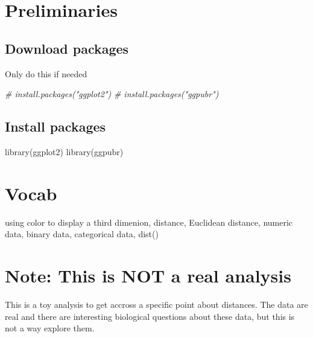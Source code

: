 \documentclass[
]{book}
\newenvironment{Shaded}{\begin{snugshade}}{\end{snugshade}}
\newcommand{\CommentTok}[1]{\textcolor[rgb]{0.56,0.35,0.01}{\textit{#1}}}
\newcommand{\FunctionTok}[1]{\textcolor[rgb]{0.00,0.00,0.00}{#1}}
\newcommand{\NormalTok}[1]{#1}
\begin{document}
\hypertarget{preliminaries-15}{%
\section{Preliminaries}\label{preliminaries-15}}

\hypertarget{download-packages-1}{%
\subsection{Download packages}\label{download-packages-1}}

Only do this if needed

\begin{Shaded}
\begin{Highlighting}[]
\CommentTok{\# install.packages("ggplot2")}
\CommentTok{\# install.packages("ggpubr")}
\end{Highlighting}
\end{Shaded}

\hypertarget{install-packages}{%
\subsection{Install packages}\label{install-packages}}

\begin{Shaded}
\begin{Highlighting}[]
\FunctionTok{library}\NormalTok{(ggplot2)}
\FunctionTok{library}\NormalTok{(ggpubr)}
\end{Highlighting}
\end{Shaded}

\hypertarget{vocab-3}{%
\section{Vocab}\label{vocab-3}}

using color to display a third dimenion, distance, Euclidean distance, numeric data, binary data, categorical data, dist()

\hypertarget{note-this-is-not-a-real-analysis}{%
\section{Note: This is NOT a real analysis}\label{note-this-is-not-a-real-analysis}}

This is a toy analysis to get accross a specific point about distances. The data are real and there are interesting biological questions about these data, but this is not a way explore them.
\end{document}
